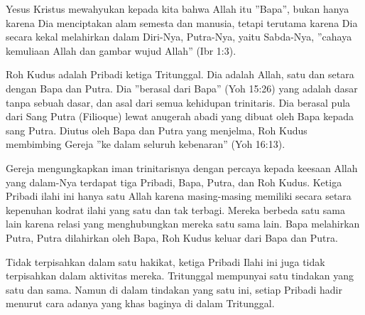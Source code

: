\newpage
{}
\setcounter{kgkcounter}{45}
\small
{}
        Yesus Kristus mewahyukan kepada kita bahwa Allah itu ”Bapa”, bukan hanya
          karena Dia menciptakan alam semesta dan manusia, tetapi terutama karena Dia
          secara kekal melahirkan dalam Diri-Nya, Putra-Nya, yaitu Sabda-Nya, ”cahaya
          kemuliaan Allah dan gambar wujud Allah” (Ibr 1:3).

Roh Kudus adalah Pribadi ketiga Tritunggal. Dia adalah Allah, satu dan
          setara dengan Bapa dan Putra. Dia ”berasal dari Bapa” (Yoh 15:26) yang adalah
          dasar tanpa sebuah dasar, dan asal dari semua kehidupan trinitaris. Dia berasal
          pula dari Sang Putra (Filioque) lewat anugerah abadi yang dibuat oleh Bapa
          kepada sang Putra. Diutus oleh Bapa dan Putra yang menjelma, Roh Kudus
          membimbing Gereja ”ke dalam seluruh kebenaran” (Yoh 16:13).

Gereja mengungkapkan iman trinitarisnya dengan percaya kepada keesaan
Allah yang dalam-Nya terdapat tiga Pribadi, Bapa, Putra, dan Roh Kudus. Ketiga
          Pribadi ilahi ini hanya satu Allah karena masing-masing memiliki secara setara
          kepenuhan kodrat ilahi yang satu dan tak terbagi. Mereka berbeda satu sama lain
          karena relasi yang menghubungkan mereka satu sama lain. Bapa melahirkan Putra,
          Putra dilahirkan oleh Bapa, Roh Kudus keluar dari Bapa dan Putra.

     Tidak terpisahkan dalam satu hakikat, ketiga Pribadi Ilahi ini juga tidak   
terpisahkan dalam aktivitas mereka. Tritunggal mempunyai satu tindakan yang      
satu dan sama. Namun di dalam tindakan yang satu ini, setiap Pribadi hadir
menurut cara adanya yang khas baginya di dalam Tritunggal.

\normalsize